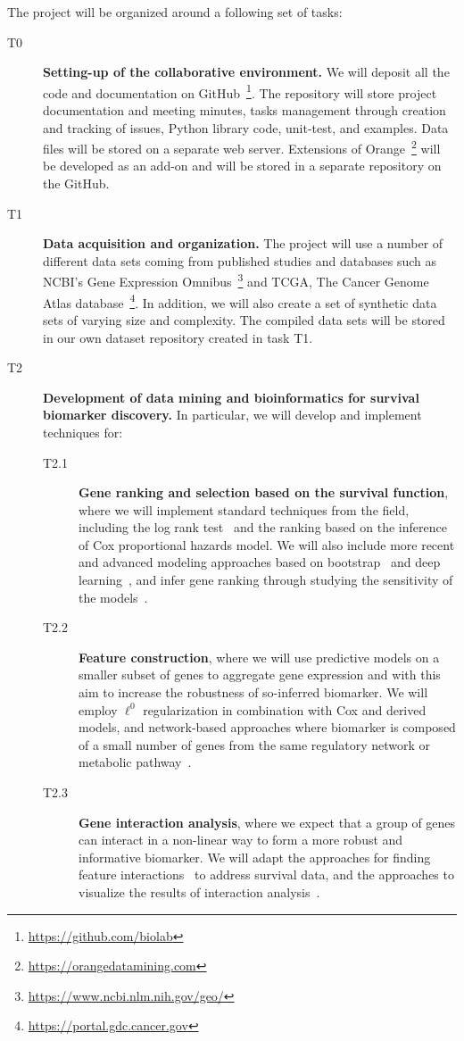 \documentclass[11pt,a4paper]{article}
\renewcommand{\bold}{\textbf}
\begin{document}
The project will be organized around a following set of tasks:
\begin{description}
	\item[T0] \bold{Setting-up of the collaborative environment.} We will deposit all the code and documentation on GitHub~\footnote{\url{https://github.com/biolab}}. The repository will store project documentation and meeting minutes, tasks management through creation and tracking of issues, Python library code, unit-test, and examples. Data files will be stored on a separate web server. Extensions of Orange~\footnote{\url{https://orangedatamining.com}} will be developed as an add-on and will be stored in a separate repository on the GitHub.
	\item[T1] \bold{Data acquisition and organization.} The project will use a number of different data sets coming from published studies and databases such as NCBI's Gene Expression Omnibus~\footnote{\url{https://www.ncbi.nlm.nih.gov/geo/}} and TCGA, The Cancer Genome Atlas database~\footnote{\url{https://portal.gdc.cancer.gov}}. In addition, we will also create a set of synthetic data sets of varying size and complexity. The compiled data sets will be stored in our own dataset repository created in task T1.
	\item[T2] \bold{Development of data mining and bioinformatics for survival biomarker discovery.} In particular, we will develop and implement techniques for:
	\begin{description}
		\item[T2.1] \bold{Gene ranking and selection based on the survival function}, where we will implement standard techniques from the field, including the log rank test~\cite{} and the ranking based on the inference of Cox proportional hazards model. We will also include more recent and advanced modeling approaches based on bootstrap~\cite{} and deep learning~\cite{}, and infer gene ranking through studying the sensitivity of the models~\cite{}.
		\item[T2.2] \bold{Feature construction}, where we will use predictive models on a smaller subset of genes to aggregate gene expression and with this aim to increase the robustness of so-inferred biomarker. We will employ $\ell^0$ regularization in combination with Cox and derived models, and network-based approaches where biomarker is composed of a small number of genes from the same regulatory network or metabolic pathway~\cite{}.
		\item[T2.3] \bold{Gene interaction analysis}, where we expect that a group of genes can interact in a non-linear way to form a more robust and informative biomarker. We will adapt the approaches for finding feature interactions~\cite{} to address survival data, and the approaches to visualize the results of interaction analysis~\cite{}.

\end{description}
\end{description}
\end{document}
